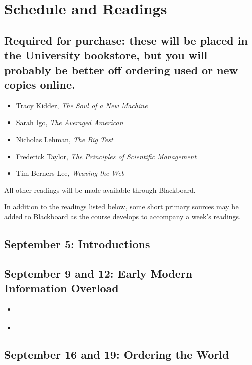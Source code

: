 \section{Schedule and Readings}

\subsection{Required for purchase: these will be placed in the
University bookstore, but you will probably be better off ordering used
or new copies online.}

\begin{itemize}
\itemsep1pt\parskip0pt
\item
  Tracy Kidder, \emph{The Soul of a New Machine}
\item
  Sarah Igo, \emph{The Averaged American}
\item
  Nicholas Lehman, \emph{The Big Test}
\item
  Frederick Taylor, \emph{The Principles of Scientific Management}
\item
  Tim Berners-Lee, \emph{Weaving the Web}
\end{itemize}

All other readings will be made available through Blackboard.

In addition to the readings listed below, some short primary sources may
be added to Blackboard as the course develops to accompany a week's
readings.

\subsection{September 5: Introductions}

\subsection{September 9 and 12: Early Modern Information Overload}

\begin{itemize}
\itemsep1pt\parskip0pt
\item
  \cite{blair_reading_2003}
\item
  \cite{muller-wille_natural_2012}
\end{itemize}

\subsection{September 16 and 19: Ordering the World}

